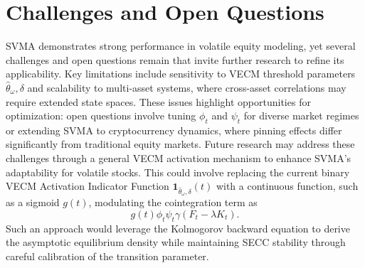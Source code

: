 \documentclass[12pt]{report}
\begin{document}
\section{Challenges and Open Questions}
SVMA demonstrates strong performance in volatile equity modeling, yet several challenges and open questions remain that invite further research to refine its applicability. Key limitations include sensitivity to VECM threshold parameters $\hat{\theta}_\omega, \delta$ and scalability to multi-asset systems, where cross-asset correlations may require extended state spaces. These issues highlight opportunities for optimization: open questions involve tuning $\phi_t$ and $\psi_t$ for diverse market regimes or extending SVMA to cryptocurrency dynamics, where pinning effects differ significantly from traditional equity markets.
\vspace{0.2in}
Future research may address these challenges through a general VECM activation mechanism to enhance SVMA's adaptability for volatile stocks. This could involve replacing the current binary VECM Activation Indicator Function $\mathbf{1}_{\hat{\theta}_\omega, \delta}(t)$ with a continuous function, such as a sigmoid $g(t)$, modulating the cointegration term as
$$g(t) \phi_t \psi_t \gamma (F_t - \lambda K_t).$$
Such an approach would leverage the Kolmogorov backward equation to derive the asymptotic equilibrium density while maintaining SECC stability through careful calibration of the transition parameter.

%
\newpage
\printbibliography[heading=bibintoc, title=References]
\newpage
\end{document}
